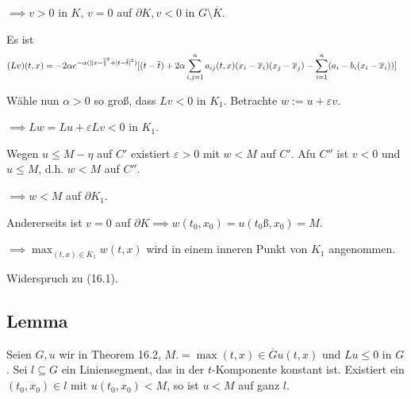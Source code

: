 $\implies v > 0$ in $K$, $v = 0$ auf $\partial K, v < 0$ in $G \setminus \overline K$.

Es ist
\begin{align*}
  (L v )(t,x) &= -2 \alpha e^{-\alpha(\lVert x - \overline \rVert^2 + |t - \overline t|^2)} 
  [(t - \overline t) + 2\alpha \sum_{i,j = 1}^n a_{ij} (t,x) (x_i - \overline x_i) (x_j - \overline x_j) - \sum_{i = 1}^n(a_i - b_i(x_i - \overline x_i))]
\end{align*}

Wähle nun $\alpha > 0$ so groß, dass $Lv < 0$ in $K_1$. Betrachte $w := u + \varepsilon v$.

$\implies Lw = Lu + \varepsilon Lv < 0$ in $K_1$.

Wegen $u \leq M - \eta$ auf $C'$ existiert $\varepsilon > 0$ mit $w < M$ auf $C'$. Afu $C''$ ist $v < 0$ und $u \leq M$, d.h. $w < M$ auf $C''$.

$\implies w < M$ auf $\partial K_1$.

Andererseits ist $v = 0$ auf $\partial K \implies w(t_0, x_0) = u(t_0ß, x_0) = M$.

$\implies \max_{(t,x) \in \overline K_1} w(t,x)$ wird in einem inneren Punkt von $K_1$ angenommen.

Widerspruch zu (16.1).

\subsection{Lemma}

Seien $G, u$ wir in Theorem 16.2, $M .= \max{(t,x) \in \overline G} u(t,x)$ und $Lu \leq 0$ in $G$.
Sei $l \subseteq G$ ein Liniensegment, das in der $t$-Komponente konstant ist. 
Existiert ein $(t_0, x_0) \in l$ mit $u(t_0, x_0) < M$, so ist $u < M$ auf ganz $l$.

